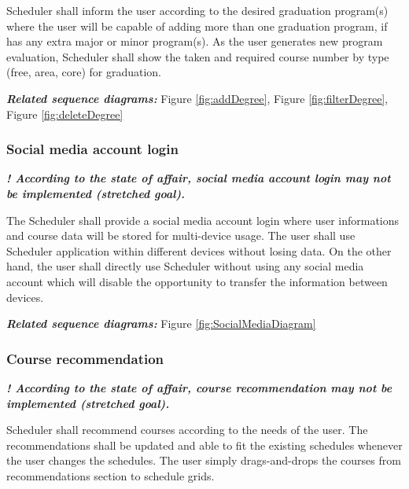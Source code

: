 \documentclass[twoside,letterpaper]{article}
\begin{document}
{\color{black}
Scheduler shall inform the user according to the desired graduation program(s) where the user will be capable of adding more than one graduation program, if has any extra major or minor program(s). As the user generates new program evaluation, Scheduler shall show the taken and required course number by type (free, area, core) for graduation.}

\smallskip

{\color{black}
\emph{\textbf{Related sequence diagrams:}} Figure \ref{fig:addDegree}, Figure \ref{fig:filterDegree}, Figure \ref{fig:deleteDegree}}

\subsubsection[Social media account login
]{\rmfamily\bfseries\color{black}
	Social media account login}

{\noindent{}\color{black}
	\textbf{\emph{! According to the state of affair, social media account login may not be implemented (stretched goal).}}}

\smallskip

{\color{black}
	The Scheduler shall provide a social media account login where user informations and course data will be stored for multi-device usage. The user shall use Scheduler application within different devices without losing data. On the other hand, the user shall directly use Scheduler without using any social media account which will disable the opportunity to transfer the information between devices. }
	
\smallskip

{\color{black}
\emph{\textbf{Related sequence diagrams:}} Figure \ref{fig:SocialMediaDiagram}}


\subsubsection[Course 
recommendation]{\rmfamily\bfseries\color{black}
	Course recommendation}
{\noindent{}\color{black}
	\textbf{\emph{! According to the state of affair, course recommendation may not be implemented (stretched goal).}}}
	
\smallskip

{\color{black}
	Scheduler shall recommend courses according to the needs of the user. The recommendations shall be updated and able to fit the existing schedules whenever the user changes the schedules. The user simply drags-and-drops the courses from recommendations section to schedule grids.}
	
\end{document}
